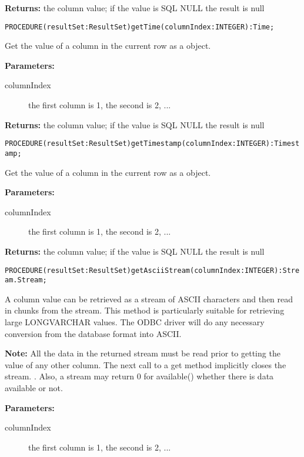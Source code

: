      {\bf Returns: } 
          the column value; if the value is SQL NULL the result is null 


\verb'PROCEDURE(resultSet:ResultSet)getTime(columnIndex:INTEGER):Time;'

     Get the value of a column in the current row as a  object. 

     {\bf Parameters: } 
\begin{description}
\item[columnIndex] the first column is 1, the second is 2, ... 
\end{description}

     {\bf Returns: } 
          the column value; if the value is SQL NULL the result is null 


\verb'PROCEDURE(resultSet:ResultSet)getTimestamp(columnIndex:INTEGER):Timestamp;'

     Get the value of a column in the current row as a  object. 

     {\bf Parameters: } 
\begin{description}
\item[columnIndex] the first column is 1, the second is 2, ... 
\end{description}

     {\bf Returns: } 
          the column value; if the value is SQL NULL the result is null 


\verb'PROCEDURE(resultSet:ResultSet)getAsciiStream(columnIndex:INTEGER):Stream.Stream;'

     A column value can be retrieved as a stream of ASCII characters and then read in chunks from the stream. This method is particularly
     suitable for retrieving large LONGVARCHAR values. The ODBC driver will do any necessary conversion from the database format into
     ASCII. 

     {\bf Note: } All the data in the returned stream must be read prior to getting the value of any other column. The next call to a get method
     implicitly closes the stream. . Also, a stream may return 0 for available() whether there is data available or not. 

     {\bf Parameters: } 
\begin{description}
\item[columnIndex] the first column is 1, the second is 2, ... 
\end{description}

